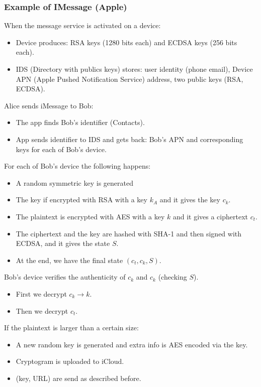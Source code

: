 \documentclass{article}
\begin{document}
\subsubsection{Example of IMessage (Apple)} When the message service is activated on a device:
\begin{itemize}
\item Device produces: RSA keys (1280 bits each) and ECDSA keys (256 bits each).
\item IDS (Directory with publics keys) stores: user identity (phone email), Device APN (Apple Pushed Notification Service) address, two public keys (RSA, ECDSA).
\end{itemize}

Alice sends iMessage to Bob:
\begin{itemize}
\item The app finds Bob's identifier (Contacts).
\item App sends identifier to IDS and gets back: Bob's APN and corresponding keys for each of Bob's device.
\end{itemize}

For each of Bob's device the following happens:
\begin{itemize}
\item A random symmetric key is generated
\item The key if encrypted with RSA with a key $ k_A $ and it gives the key $ c_k $.
\item The plaintext is encrypted with AES with a key $ k $ and it gives a ciphertext $ c_t $.
\item The ciphertext and the key are hashed with SHA-1 and then signed with ECDSA, and it gives the state $ S $.
\item At the end, we have the final state $ (c_t, c_k, S) $.
\end{itemize}

Bob's device verifies the authenticity of $ c_k $ and $ c_k $ (checking $ S $).
\begin{itemize}
\item First we decrypt $ c_k \rightarrow k $.
\item Then we decrypt $ c_t $.
\end{itemize} 

If the plaintext is larger than a certain size:
\begin{itemize}
\item A new random key is generated and extra info is AES encoded via the key.
\item Cryptogram is uploaded to iCloud.
\item (key, URL) are send as described before.
\end{itemize}
\end{document}
